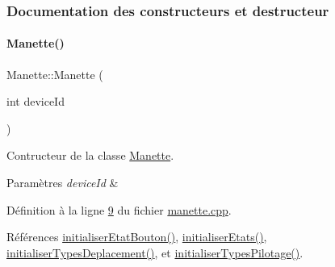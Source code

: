 \subsubsection{Documentation des constructeurs et destructeur}
\mbox{\label{class_manette_aaeb630a14bd4905666146dca3253827b}} 
\paragraph{\texorpdfstring{Manette()}{Manette()}}
{\footnotesize\ttfamily Manette\+::\+Manette (\begin{DoxyParamCaption}\item[{int}]{device\+Id }\end{DoxyParamCaption})\hspace{0.3cm}{\ttfamily [explicit]}}



Contructeur de la classe \hyperlink{class_manette}{Manette}. 


\begin{DoxyParams}{Paramètres}
{\em device\+Id} & \\
\hline
\end{DoxyParams}


Définition à la ligne \hyperlink{manette_8cpp_source_l00009}{9} du fichier \hyperlink{manette_8cpp_source}{manette.\+cpp}.



Références \hyperlink{manette_8cpp_source_l00313}{initialiser\+Etat\+Bouton()}, \hyperlink{manette_8cpp_source_l00023}{initialiser\+Etats()}, \hyperlink{manette_8cpp_source_l00085}{initialiser\+Types\+Deplacement()}, et \hyperlink{manette_8cpp_source_l00040}{initialiser\+Types\+Pilotage()}.


